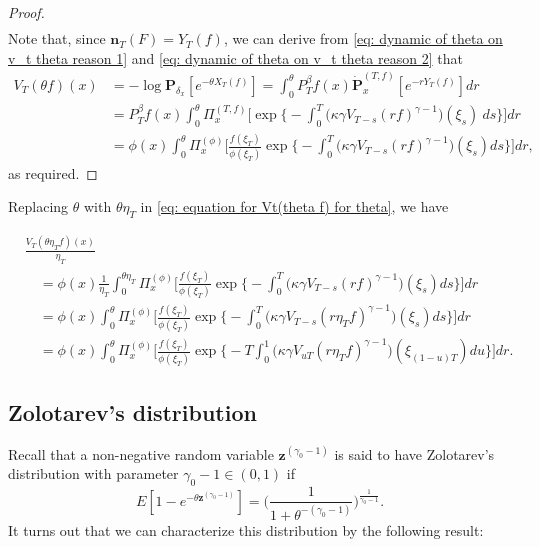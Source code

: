 \documentclass[12pt, a4paper]{amsart}
\theoremstyle{definition}
\numberwithin{equation}{section}
\begin{document}
\begin{proof}
\[\begin{split}
\end{split}\]
	Note that, since $\mathbf n_T(F)= Y_T(f)$, we can derive from \eqref{eq: dynamic of theta on v_t theta reason 1} and \eqref{eq: dynamic of theta on v_t theta reason 2} that
\[\begin{split}
	V_T(\theta f)(x)
	&= -\log \mathbf P_{\delta_x}[e^{-\theta X_T(f)}]
	= \int_0^\theta
P^\beta_Tf(x)
	\dot {\mathbf P}_x^{(T,f)}[e^{-r  Y_T(f)}] dr
	 \\&=P^\beta_Tf(x)\int_0^\theta \Pi_x^{(T,f)} \Big[\exp\Big\{-\int_0^T \big(\kappa\gamma V_{T-s}(r f)^{\gamma-1}\big)(\xi_s)~ds\Big\}\Big] dr
	\\&= \phi( x) \int_0^\theta \Pi_x^{(\phi)} \Big[ \frac{ f(\xi_T) } { \phi(\xi_T) } \exp\Big\{ - \int_0^T \big( \kappa \gamma V_{T-s} (r f)^{ \gamma - 1} \big) ( \xi_s) ds\Big\} \Big] dr,
\end{split}\]
as required.
\end{proof}

	Replacing $\theta$ with $\theta \eta_T$ in \eqref{eq: equation for Vt(theta f) for theta}, we have

\[\label{eq: equation for normalized V_T}\begin{split}
	&\frac{V_T(\theta \eta_T f)(x)}{\eta_T}
	\\&\quad= \phi(x) \frac{1}{\eta_T}\int_0^{\theta \eta_T} \Pi_x^{(\phi)} \Big[ \frac { f(\xi_T) } { \phi(\xi_T) } \exp\Big\{-\int_0^T \big(\kappa\gamma V_{T-s}(r f)^{\gamma-1}\big)(\xi_s) ds\Big\}\Big] dr
	\\&\quad = \phi(x) \int_0^{\theta} \Pi_x^{(\phi)} \Big[ \frac { f(\xi_T) } { \phi(\xi_T) }  \exp\Big\{-\int_0^T \big(\kappa\gamma V_{T-s}(r \eta_T f)^{\gamma-1}\big)(\xi_s) ds\Big\}\Big] dr
	\\&\quad = \phi(x)\int_0^{\theta} \Pi_x^{(\phi)} \Big[\frac{f(\xi_T)}{\phi(\xi_T)} \exp\Big\{-T\int_0^1 \big(\kappa\gamma V_{uT}(r \eta_T f)^{\gamma-1}\big)(\xi_{(1-u)T}) du\Big\}\Big] dr.
\end{split}\]

\subsection{Zolotarev's distribution}
\label{sec: Characterizing the Zolotarev's distribution using an non-linear delay equation}

	Recall that a 
  non-negative 
random variable $\mathbf z^{(\gamma_0 - 1)}$ is said to have Zolotarev's distribution with parameter $\gamma_0 - 1 \in (0,1)$ if
\[
	E[1-e^{-\theta\mathbf z^{(\gamma_0 - 1)}}]
	=\Big( \frac{1}{1+\theta^{-(\gamma_0 - 1)}} \Big)^{\frac{1}{\gamma_0 - 1}}.
\]
	It turns out that we can characterize this distribution by the following result:
\end{document}
